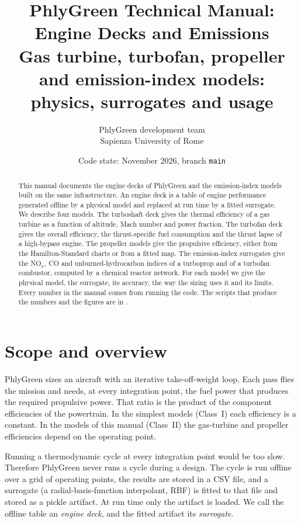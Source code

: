 \documentclass[a4paper,11pt]{article}
\title{PhlyGreen Technical Manual: Engine Decks and Emissions\\[4pt]
\large Gas turbine, turbofan, propeller and emission-index models: physics, surrogates and usage}
\author{PhlyGreen development team\\Sapienza University of Rome}
\date{Code state: November 2026, branch \texttt{main}}
\begin{document}
\maketitle

\begin{abstract}
\noindent This manual documents the engine decks of PhlyGreen and the emission-index models
built on the same infrastructure. An engine deck is a table of engine performance generated
offline by a physical model and replaced at run time by a fitted surrogate. We describe four
models. The turboshaft deck gives the thermal efficiency of a gas turbine as a function of
altitude, Mach number and power fraction. The turbofan deck gives the overall efficiency, the
thrust-specific fuel consumption and the thrust lapse of a high-bypass engine. The propeller
models give the propulsive efficiency, either from the Hamilton-Standard charts or from a
fitted map. The emission-index surrogates give the NO$_x$, CO and unburned-hydrocarbon indices
of a turboprop and of a turbofan combustor, computed by a chemical reactor network. For each
model we give the physical model, the surrogate, its accuracy, the way the sizing uses it and
its limits. Every number in the manual comes from running the code. The scripts that produce
the numbers and the figures are in .
\end{abstract}

\tableofcontents
\newpage

\section{Scope and overview}\label{sec:scope}

PhlyGreen sizes an aircraft with an iterative take-off-weight loop. Each pass flies the mission
and needs, at every integration point, the fuel power that produces the required propulsive
power. That ratio is the product of the component efficiencies of the powertrain. In the
simplest models (Class~I) each efficiency is a constant. In the models of this manual
(Class~II) the gas-turbine and propeller efficiencies depend on the operating point.

Running a thermodynamic cycle at every integration point would be too slow. Therefore
PhlyGreen never runs a cycle during a design. The cycle is run offline over a grid of operating
points, the results are stored in a CSV file, and a surrogate (a radial-basis-function
interpolant, RBF) is fitted to that file and stored as a pickle artifact. At run time only the
artifact is loaded. We call the offline table an \emph{engine deck}, and the fitted artifact its
\emph{surrogate}.
\end{document}
